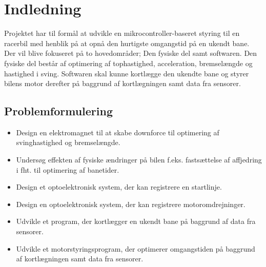 \section{Indledning}
Projektet har til formål at udvikle en mikrocontroller-baseret styring til en racerbil med henblik på at opnå den hurtigste omgangstid på en ukendt bane.
Der vil blive fokuseret på to hovedområder; Den fysiske del samt softwaren. Den fysiske del består af optimering af tophastighed, acceleration, bremselængde og hastighed i sving.
Softwaren skal kunne kortlægge den ukendte bane og styrer bilens motor derefter på baggrund af kortlægningen samt data fra sensorer.

\subsection{Problemformulering}
\begin{itemize}
	\item Design en elektromagnet til at skabe downforce til optimering af svinghastighed og bremselængde.
	\item Undersøg effekten af fysiske ændringer på bilen f.eks. fastsættelse af affjedring i fht. til optimering af banetider.
	\item Design et optoelektronisk system, der kan registrere en startlinje.
	\item Design en optoelektronisk system, der kan registrere motoromdrejninger.
	\item Udvikle et program, der kortlægger en ukendt bane på baggrund af data fra sensorer.
	\item Udvikle et motorstyringsprogram, der optimerer omgangstiden på baggrund af kortlægningen samt data fra sensorer.
\end{itemize}
